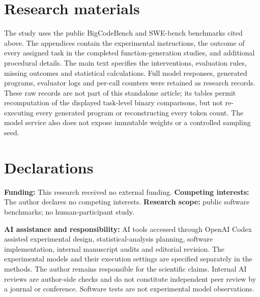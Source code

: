 \section*{Research materials}
The study uses the public BigCodeBench and SWE-bench benchmarks cited above. The appendices contain the experimental instructions, the outcome of every assigned task in the completed function-generation studies, and additional procedural details. The main text specifies the interventions, evaluation rules, missing outcomes and statistical calculations. Full model responses, generated programs, evaluator logs and per-call counters were retained as research records. These raw records are not part of this standalone article; its tables permit recomputation of the displayed task-level binary comparisons, but not re-executing every generated program or reconstructing every token count. The model service also does not expose immutable weights or a controlled sampling seed.

\section*{Declarations}
\textbf{Funding:} This research received no external funding. \textbf{Competing interests:} The author declares no competing interests. \textbf{Research scope:} public software benchmarks; no human-participant study.

\textbf{AI assistance and responsibility:} AI tools accessed through OpenAI Codex assisted experimental design, statistical-analysis planning, software implementation, internal manuscript audits and editorial revision. The experimental models and their execution settings are specified separately in the methods. The author remains responsible for the scientific claims. Internal AI reviews are author-side checks and do not constitute independent peer review by a journal or conference. Software tests are not experimental model observations.

\clearpage\appendix
